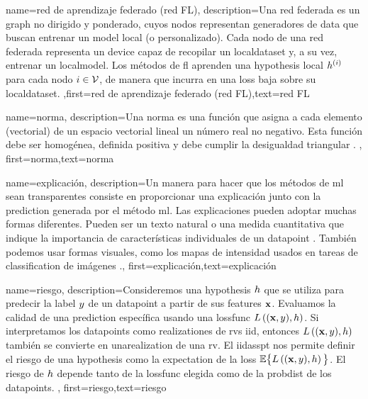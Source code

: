 {{
{name={red de aprendizaje federado (red FL)},
	description={Una red federada es un \gls{graph} no dirigido y ponderado, 
	cuyos nodos representan generadores de \gls{data} que buscan entrenar un \gls{model} local (o personalizado). 
	Cada nodo de una red federada representa un \gls{device} capaz de recopilar un \gls{localdataset}
	y, a su vez, entrenar un \gls{localmodel}. 
	Los métodos de \gls{fl} aprenden una \gls{hypothesis} local $h^{(i)}$ para
	cada nodo $i \in \mathcal{V}$, de manera que incurra en una \gls{loss} baja sobre su \gls{localdataset}.
	,first={red de aprendizaje federado (red FL)},text={red FL} 
} }

{name={norma},
	description={Una norma es una función que asigna a cada elemento (vectorial) de un espacio 
		vectorial lineal un número real no negativo. Esta función debe ser homogénea, definida positiva y debe 
		cumplir la desigualdad triangular \cite{HornMatAnalysis}. },
	first={norma},text={norma} 
}

{name={explicación},
	description={Un manera para hacer que los métodos de \gls{ml} sean transparentes consiste en  
		proporcionar una explicación junto con la \gls{prediction} generada por el método 
		\gls{ml}. Las explicaciones pueden adoptar muchas formas diferentes. Pueden ser un texto natural
		o una medida cuantitativa que indique la importancia de características individuales
		de un \gls{datapoint} \cite{Molnar2019}.
 		También podemos usar formas visuales, como los mapas de intensidad usados en tareas de \gls{classification} de imágenes \cite{GradCamPaper}.},
		first={explicación},text={explicación} 
}

{name={riesgo},
	description={Consideremos una \gls{hypothesis} $h$ que se utiliza para predecir la \gls{label} 
		$y$ de un \gls{datapoint} a partir de sus \gls{feature}s ${\bf x}$. Evaluamos 
		la calidad de una \gls{prediction} específica usando una \gls{lossfunc} $L\left(({\bf x},y),h \right)$. 
		Si interpretamos los  \gls{datapoint}s como \gls{realization}es de \gls{rv}s \gls{iid}, 
		entonces $L\left(({\bf x},y),h \right)$ también se convierte en una\gls{realization} 
		de una \gls{rv}. El \gls{iidasspt} nos permite definir el riesgo de una \gls{hypothesis} 
		como la \gls{expectation} de la \gls{loss} $\mathbb{E} \big\{L\left(({\bf x},y),h \right) \big\}$. 
		El riesgo de $h$ depende tanto de la \gls{lossfunc} elegida como de la \gls{probdist} de los \gls{datapoint}s.
		},
	first={riesgo},text={riesgo} 
}

}}

